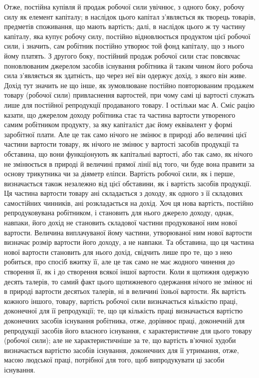Отже, постійна купівля й продаж робочої сили увічнює, з одного
боку, робочу силу як елемент капіталу; в наслідок цього капітал з’являється
як творець товарів, предметів споживання, що мають вартість;
далі, в наслідок цього ж ту частину капіталу, яка купує робочу силу, постійно
відновлюється продуктом цієї робочої сили, і значить, сам робітник постійно
утворює той фонд капіталу, що з нього йому платять. З другого
боку, постійний продаж робочої сили стає повсякчас поновлюваним джерелом
засобів існування робітника й таким чином його робоча сила
з’являється як здатність, що через неї він одержує дохід, з якого він
живе. Дохід тут значить не що інше, як зумовлюване постійно повторюваним
продажем товару (робочої сили) привласнення вартостей, при
чому самі ці вартості служать лише для постійної репродукції продаваного
товару. І остільки має А. Сміс рацію казати, що джерелом доходу
робітника стає та частина вартости утвореного самим робітником продукту, за
яку капіталіст дає йому еквівалент у формі заробітної плати. Але це так
само нічого не змінює в природі або величині цієї частини вартости товару,
як нічого не змінює у вартості засобів продукції та обставина, що
вони функціонують як капітальні вартості, або так само, як нічого не
змінюється в природі й величині прямої лінії від того, чи буде вона правити
за основу трикутника чи за діяметр еліпси. Вартість робочої сили,
як і перше, визначається також незалежно від цієї обставини, як і вартість
засобів продукції. Ця частина вартости товару ані складається з доходу,
як одного з її складових самостійних чинників, ані розкладається на
дохід. Хоч ця нова вартість, постійно репродуковувана робітником, і становить
для нього джерело доходу, однак, навпаки, його дохід не становить
складової частини продукованої ним нової вартости. Величина виплачуваної
йому частини, утворюваної ним нової вартости визначає розмір
вартости його доходу, а не навпаки. Та обставина, що ця частина нової
вартости становить для нього дохід, свідчить лише про те, що з нею робиться,
про спосіб вжитку її, але це так само не має жодного чинення до створення
її, як і до створення всякої іншої вартости. Коли я щотижня
одержую десять талерів, то самий факт цього щотижневого одержання
нічого не змінює ні в природі вартости десятьох талерів, ні в величині
їхньої вартости. Як вартість кожного іншого, товару, вартість робочої
сили визначається кількістю праці, доконечної для її репродукції; те, що
ця кількість праці визначається вартістю доконечних засобів існування
робітника, отже, дорівнює праці, доконечній для репродукції засобів його
власного існування, є характеристичне для цього товару (робочої сили);
але не характеристичніше за те, що вартість в’ючної худоби визначається
вартістю засобів існування, доконечних для її утримання, отже,
масою людської праці, потрібної для того, щоб випродукувати ці засоби
існування.


